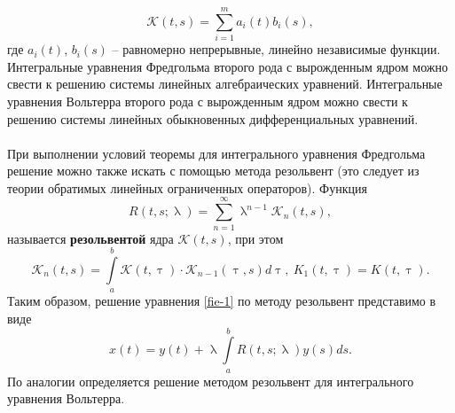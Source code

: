 \documentclass[a4paper, 12pt]{report}
\numberwithin{equation}{section}
\renewcommand{\tau}{\uptau}
\renewcommand{\lambda}{\uplambda}
\begin{document}
	\begin{equation*}
		\mathcal K(t,s) = \sum_{i=1}^{m} a_i(t) b_i(s),
	\end{equation*}
	где $a_i(t)$, $b_i(s)$ -- равномерно непрерывные, линейно независимые функции. Интегральные уравнения Фредгольма второго рода с вырожденным ядром можно свести к решению системы линейных алгебраических уравнений. Интегральные уравнения Вольтерра второго рода с вырожденным ядром можно свести к решению системы линейных обыкновенных дифференциальных уравнений. 
	\\\\
	При выполнении условий теоремы для интегрального уравнения Фредгольма решение можно также искать с помощью метода резольвент (это следует из теории обратимых линейных ограниченных операторов). Функция
	\begin{equation}
		R(t,s;\lambda)=\sum_{n=1}^{\infty} \lambda^{n-1} \mathcal K_n(t,s),
	\end{equation}
	называется \textbf{резольвентой} ядра $\mathcal K(t,s)$, при этом
	\begin{equation}
		\mathcal K_n(t,s) = \int\limits_a^b \mathcal K(t,\tau) \cdot \mathcal K_{n-1}(\tau, s)d\tau,\ K_1(t,\tau) = K(t,\tau).
	\end{equation}
	Таким образом, решение уравнения \eqref{fie-1} по методу резольвент представимо в виде
	\begin{equation}
		x(t) = y(t) + \lambda \int\limits_a^b R(t,s;\lambda)y(s)ds.
	\end{equation}
	По аналогии определяется решение методом резольвент для интегрального уравнения Вольтерра.
	
\end{document}
